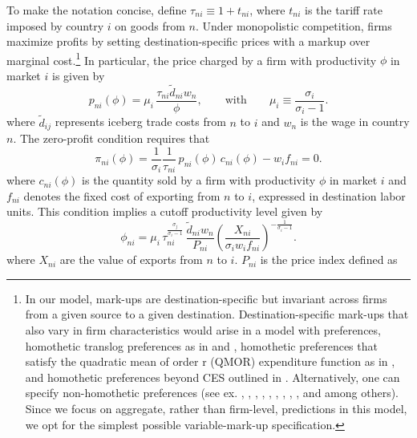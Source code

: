 \documentclass[12pt]{article}
\begin{document}
To make the notation concise, define $\tau_{ni}\equiv1+t_{ni}$, where $t_{ni}$ is the tariff rate imposed by country $i$ on goods from $n$.%
Under monopolistic competition, firms maximize profits by setting destination-specific prices with a markup over marginal cost.\footnote{In our model, mark-ups are destination-specific but invariant across firms from a given source to a given destination. Destination-specific mark-ups that also vary in firm characteristics would arise in a model with \citet{kimball} preferences, homothetic translog preferences as in \citet{bergin_feenstra} and  \citet{feenstra2017globalization}, homothetic preferences that satisfy the quadratic mean of order r (QMOR) expenditure function as in \citet{FEENSTRA201816}, and homothetic preferences beyond CES outlined in \citet{matsuyama2017beyond}. Alternatively, one can specify non-homothetic preferences (see ex. \citet{10.1111/j.1467-937X.2007.00463.x}, \citet{saure2012bounded}, \citet{https://doi.org/10.3982/ECTA9986},  \citet{BEHRENS2012703}, \citet{behrens2014trade}, \citet{simonovska2015}, \citet{10.1257/mic.20160382}, \citet{jsw2019}, \citet{dhingra2019monopolistic}, and \citet{macedoni2025international} among others). Since we focus on aggregate, rather than firm-level, predictions in this model, we opt for the simplest possible variable-mark-up specification.} In particular, the price charged by a firm with productivity \(\phi\) in market \(i\) is given by
\[
p_{ni}(\phi) = \mu_i\,\frac{\tau_{ni} \tilde{d}_{ni} w_n}{\phi}, \qquad\text{with}\qquad \mu_i \equiv \frac{\sigma_i}{\sigma_i - 1}.
\]
where $\tilde{d}_{ij}$ represents iceberg trade costs from $n$ to $i$ and $w_n$ is the wage in country $n$. The zero-profit condition requires that
\[
\pi_{ni}(\phi) = \frac{1}{\sigma_i}\frac{1}{\tau_{ni}}\, p_{ni}(\phi)\, c_{ni}(\phi) - w_i f_{ni} = 0.
\]
where $c_{ni}(\phi)$ is the quantity sold by a firm with productivity \(\phi\) in market \(i\) and $f_{ni}$ denotes the fixed cost of exporting from $n$ to $i$, expressed in destination labor units. This condition implies a cutoff productivity level given by
\begin{equation} \label{eq: phi_ij}
\phi_{ni} = \mu_i \,\tau_{ni}^{\frac{\sigma_j}{\sigma_i-1}}\,\frac{\tilde{d}_{ni} w_n}{P_{ni}}\left(\frac{X_{ni}}{\sigma_i w_i f_{ni}}\right)^{-\frac{1}{\sigma_i-1}}.
\end{equation}
where $X_{ni}$ are the value of exports from $n$ to $i$. $P_{ni}$ is the price index defined as
\end{document}
